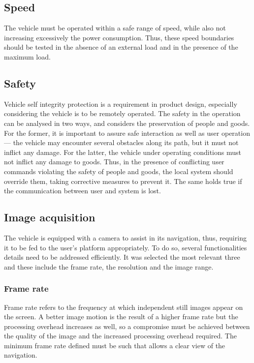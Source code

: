 \subsection{Speed}%
\label{sec:speed-tests}
The vehicle must be operated within a safe range of speed, while also not increasing excessively the power consumption. Thus, these speed boundaries should be tested in the absence of an external load and in the presence of the maximum load.
\subsection{Safety}%
\label{sec:org83942c3}
Vehicle self integrity protection is a requirement in product design, especially considering the vehicle is to
be remotely operated. The safety in the operation can be analysed in two ways, and considers the
preservation of people and goods. For the former, it is important to assure safe interaction as well as user operation --- the vehicle may encounter
several obstacles along its path, but it must not inflict any damage. For the
latter, the vehicle under operating conditions must not inflict any damage to
goods. Thus, in the presence of conflicting user commands violating the safety
of people and goods, the local system should override them, taking corrective
measures to prevent it. The same holds true if the communication between user
and system is lost.
\subsection{Image acquisition}%
\label{sec:image-acquisit}
The vehicle is equipped with a camera to assist in its navigation,
thus, requiring it to be fed to the user's platform appropriately. To do so, several functionalities details need to be addressed efficiently. It was selected the most relevant three and these include the frame rate, the resolution and the image range.
\subsubsection{Frame rate}%
\label{sec:org5adf4ee}
Frame rate refers to the frequency at which independent still images appear on the screen. A better image motion is the result of a higher frame rate but the processing overhead increases as well, so a compromise must be achieved between the quality of the image and the increased processing overhead required. The minimum frame rate defined must be such that allows a clear view of the navigation.
